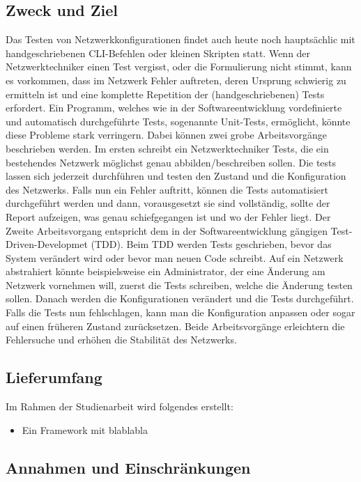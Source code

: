 \documentclass[
	ngerman,
	toc=listof, %
	toc=bibliography, %
	footnotes=multiple, %
	parskip=half, %
	numbers=noendperiod %
]{scrartcl}
\begin{document}
	\subsection{Zweck und Ziel}
		Das Testen von Netzwerkkonfigurationen findet auch heute noch hauptsächlic mit handgeschriebenen CLI-Befehlen oder kleinen Skripten statt. 
		Wenn der Netzwerktechniker einen Test vergisst, oder die Formulierung nicht stimmt,	kann es vorkommen, dass im Netzwerk Fehler auftreten, deren Ursprung schwierig zu ermitteln ist und eine komplette Repetition der (handgeschriebenen) Tests erfordert. 
		Ein Programm, welches wie in der Softwareentwicklung vordefinierte und automatisch durchgeführte Tests, sogenannte Unit-Tests, ermöglicht, könnte diese Probleme stark verringern.
		Dabei können zwei grobe Arbeitsvorgänge beschrieben werden. 
		Im ersten schreibt ein Netzwerktechniker Tests, die ein bestehendes Netzwerk möglichst genau abbilden/beschreiben sollen.
		Die tests lassen sich jederzeit durchführen und testen den Zustand und die Konfiguration des Netzwerks. 
		Falls nun ein Fehler auftritt, können die Tests automatisiert durchgeführt werden und dann, vorausgesetzt sie sind vollständig, sollte der Report aufzeigen, was genau schiefgegangen ist und wo der Fehler liegt.
		Der Zweite Arbeitsvorgang entspricht dem in der Softwareentwicklung gängigen Test-Driven-Developmet (TDD). 
		Beim TDD werden Tests geschrieben, bevor das System verändert wird oder bevor man neuen Code schreibt. 
		Auf ein Netzwerk abstrahiert könnte beispielsweise ein Administrator, der eine Änderung am Netzwerk vornehmen will, zuerst die Tests schreiben, welche die Änderung testen sollen. 
		Danach werden die Konfigurationen verändert und die Tests durchgeführt. 
		Falls die Tests nun fehlschlagen, kann man die Konfiguration anpassen oder sogar auf einen früheren Zustand zurücksetzen. 
		Beide Arbeitsvorgänge erleichtern die Fehlersuche und erhöhen die Stabilität des Netzwerks.	

	\subsection{Lieferumfang}
		Im Rahmen der Studienarbeit wird folgendes erstellt:
		\begin{itemize}
			\item Ein Framework mit blablabla
		\end{itemize}
	\subsection{Annahmen und Einschränkungen}
\end{document}
